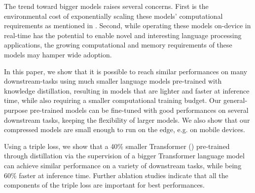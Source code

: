 \documentclass{article}
\begin{document}
The trend toward bigger models raises several concerns. First is the environmental cost of exponentially scaling these models' computational requirements as mentioned in \citet{Schwartz2019GreenA, Strubell2019EnergyAP}. Second, while operating these models on-device in real-time has the potential to enable novel and interesting language processing applications, the growing computational and memory requirements of these models may hamper wide adoption.

In this paper, we show that it is possible to reach similar performances on many downstream-tasks using much smaller language models pre-trained with knowledge distillation, resulting in models that are lighter and faster at inference time, while also requiring a smaller computational training budget. Our general-purpose pre-trained models can be fine-tuned with good performances on several downstream tasks, keeping the flexibility of larger models. We also show that our compressed models are small enough to run on the edge, e.g. on mobile devices.

Using a triple loss, we show that a 40\% smaller Transformer (\citet{Vaswani2017AttentionIA}) pre-trained through distillation via the supervision of a bigger Transformer language model can achieve similar performance on a variety of downstream tasks, while being 60\% faster at inference time.  Further ablation studies indicate that all the components of the triple loss are important for best performances.
\end{document}
